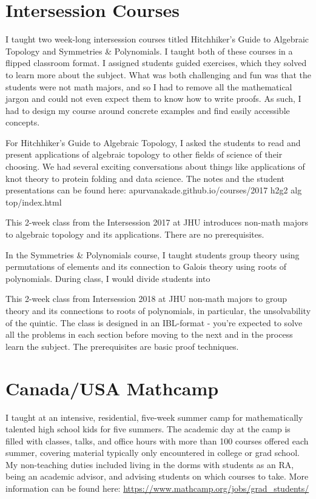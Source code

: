 \documentclass[
]{report}
\begin{document}
\hypertarget{intersession-courses}{%
\section{Intersession Courses}\label{intersession-courses}}

I taught two week-long intersession courses titled Hitchhiker's Guide to Algebraic Topology and Symmetries
\& Polynomials. I taught both of these courses in a flipped classroom format. I assigned students guided
exercises, which they solved to learn more about the subject. What was both challenging and fun was that
the students were not math majors, and so I had to remove all the mathematical jargon and could not even
expect them to know how to write proofs. As such, I had to design my course around concrete examples and
find easily accessible concepts.

For Hitchhiker's Guide to Algebraic Topology, I asked the students to read and present applications of algebraic
topology to other fields of science of their choosing. We had several exciting conversations about things like
applications of knot theory to protein folding and data science. The notes and the student presentations can
be found here: apurvanakade.github.io/courses/2017 h2g2 alg top/index.html

This 2-week class from the Intersession 2017 at JHU introduces non-math majors to algebraic topology and its applications. There are no prerequisites.

In the Symmetries \& Polynomials course, I taught students group theory using permutations of elements
and its connection to Galois theory using roots of polynomials. During class, I would divide students into

This 2-week class from Intersession 2018 at JHU non-math majors to group theory and its connections to roots of polynomials, in particular, the unsolvability of the quintic. The class is designed in an IBL-format - you're expected to solve all the problems in each section before moving to the next and in the process learn the subject. The prerequisites are basic proof techniques.

\hypertarget{canadausa-mathcamp}{%
\section{Canada/USA Mathcamp}\label{canadausa-mathcamp}}

I taught at an intensive, residential, five-week summer camp for mathematically talented high school
kids for five summers. The academic day at the camp is filled with classes, talks, and office hours with
more than 100 courses offered each summer, covering material typically only encountered in college or
grad school. My non-teaching duties included living in the dorms with students as an RA, being an
academic advisor, and advising students on which courses to take. More information can be found here:
\url{https://www.mathcamp.org/jobs/grad_students/}
\end{document}
